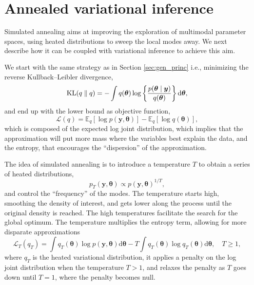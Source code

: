 \documentclass[a4paper, 11pt]{report}
\numberwithin{equation}{chapter}
\DeclareMathOperator*{\KL}{{\rm KL}}
\begin{document}
\section{Annealed variational inference}
Simulated annealing aims at improving the exploration of multimodal parameter spaces, using heated distributions to sweep the local modes away. We next describe how it can be coupled with variational inference to achieve this aim.

We start with the same strategy as in Section \ref{sec:gen_princ} i.e., minimizing the reverse Kullback--Leibler divergence,
\begin{equation*}
\KL(q \parallel q) = -\int q(\boldsymbol{\theta}) \log\left\lbrace\frac{p(\boldsymbol{\theta}\mid\boldsymbol{y})}{q(\boldsymbol{\theta})}\right\rbrace \mathrm{d}\boldsymbol{\theta},
\end{equation*}
and end up with the lower bound as objective function,
\begin{equation*}
\mathcal{L}(q) = \mathbb{E}_q\left[ \log p(\boldsymbol{y}, \boldsymbol{\theta})\right] - \mathbb{E}_q\left[\log q(\boldsymbol{\theta})\right],
\end{equation*}
which is composed of the expected log joint distribution, which implies that the approximation will put more mass where the variables best explain the data, and the entropy, that encourages the ``dispersion'' of the approximation. 

The idea of simulated annealing is to introduce a temperature $T$ to obtain a series of heated distributions,
\begin{equation*}
p_T(\boldsymbol{y},\boldsymbol{\theta}) \propto p(\boldsymbol{y},\boldsymbol{\theta})^{1/T},
\end{equation*}
and control the ``frequency'' of the modes. The temperature starts high, smoothing the density of interest, and gets lower along the process until the original density is reached. The high temperatures facilitate the search for the global optimum. The temperature multiplies the entropy term, allowing for more disparate approximations
\begin{equation}
\mathcal{L}_T(q_T) = \int q_T(\boldsymbol{\theta}) \log p(\boldsymbol{y},\boldsymbol{\theta})\mathrm{d}\boldsymbol{\theta} - T \int q_T(\boldsymbol{\theta}) \log q_T(\boldsymbol{\theta}) \mathrm{d}\boldsymbol{\theta},\quad T\geq 1,
\label{eq:ann_elbo}
\end{equation}
where $q_T$ is the heated variational distribution, it applies a penalty on the log joint distribution when the temperature $T > 1$, and relaxes the penalty as $T$ goes down until $T = 1$, where the penalty becomes null.
\end{document}
